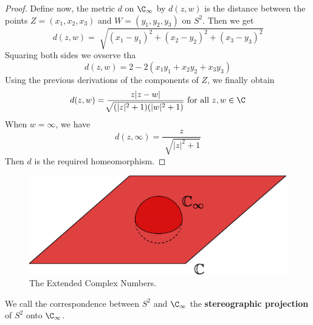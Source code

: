 \begin{proof}
    Define now, the metric $d$ on  $\C_\infty$ by  $d(z,w)$ is the distance
    between the points $Z=(x_1,x_2,x_3)$ and $W=(y_1,y_2,y_3)$ on $S^2$. Then we
    get
    \begin{equation*}
        d(z,w)=\sqrt[]{(x_1-y_1)^2+(x_2-y_2)^2+(x_3-y_3)^2}
    \end{equation*}
    Squaring both sides we ovserve tha
    \begin{equation*}
        d(z,w)=2-2(x_1y_1+x_2y_2+x_3y_3)
    \end{equation*}
    Using the previous derivations of the components of $Z$, we finally obtain
    \begin{equation*}
        d(z,w)=\frac{z|z-w|}{\sqrt[]{(|z|^2+1)(|w|^2+1)}} \text{ for all }
        z,w \in \C
    \end{equation*}
    When $w=\infty$, we have
    \begin{equation*}
        d(z,\infty)=\frac{z}{\sqrt[]{|z|^2+1}}
    \end{equation*}
    Then $d$ is the required homeomorphism.
\end{proof}

\begin{figure}[h]
    \centering
    \includegraphics[scale=0.5]{Figures/chapter1/extended_complex_numbers.eps}
    \caption{The Extended Complex Numbers.}
    \label{fig_1.2}
\end{figure}

\begin{definition}
    We call the correspondence between $S^2$ and  $\C_\infty$ the
    \textbf{stereographic projection} of $S^2$ onto $\C_\infty$.
\end{definition}
